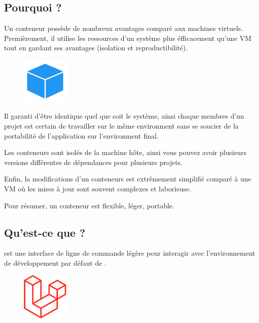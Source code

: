 \documentclass[internal]{nhitec_design}
\begin{document}
    \subsection[Pourquoi Docker?]{Pourquoi \docker{}?}

        Un conteneur \docker{} possède de nombreux avantages comparé aux machines virtuels. Premièrement, il utilise les ressources d'un système plus éfficacement qu'une VM tout en gardant ses avantages (isolation et reproductibilité). 

        \begin{figure}
            \centering
            \includegraphics[width=0.2\textwidth]{Images_formation/Iconconteneur.png}
        \end{figure}

        Il garanti d'être identique quel que soit le système, ainsi chaque membres d'un projet est certain de travailler sur le même environment sans se soucier de la portabilité de l'application sur l'environment final.
        
        Les conteneurs sont isolés de la machine hôte, ainsi vous pouvez avoir plusieurs versions différentes de dépendances pour plusieurs projets.

        Enfin, la modifications d'un conteneurs est extrêmement simplifié comparé à une VM où les mises à jour sont souvent complexes et laborieuse.

        Pour résumer, un conteneur \docker{} est flexible, léger, portable.

        
\newpage

    \subsection[Qu'est-ce que Laravel Sail?]{Qu'est-ce que \laravelsail{}?}
        
        \laravelsail{} est une interface de ligne de commande légère pour interagir avec l'environnement de développement \docker{} par défaut de \laravel{}. 
        
        \begin{figure}
            \centering
            \includegraphics[width=0.2\textwidth]{Images_formation/LaravelLogo.png}
        \end{figure}
        
\end{document}
